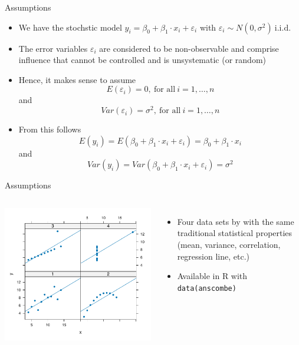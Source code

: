 \documentclass[aspectratio=169]{beamer}
\begin{document}
\begin{frame}{Assumptions}
  \begin{itemize}
    \item We have the stochstic model $y_i = \beta_0 + \beta_1 \cdot x_i +
      \varepsilon_i$ with $\varepsilon_i \sim N(0, \sigma^2)~\text{i.i.d.}$
    \item The error variables $\varepsilon_i$ are considered to be
      non-observable and comprise influence that cannot be controlled and is
      unsystematic (or random)
    \item Hence, it makes sense to assume
    \[
      E(\varepsilon_i) = 0, ~\text{for all}~ i = 1, \ldots, n
    \]
    and
    \[
      Var(\varepsilon_i) = \sigma^2, ~\text{for all}~ i = 1, \ldots, n
    \]
  \item From this follows
\[
  E(y_i) = E(\beta_0 + \beta_1 \cdot x_i + \varepsilon_i) =
  \beta_0 + \beta_1 \cdot x_i
\]
and
\[
  Var(y_i) = Var(\beta_0 + \beta_1 \cdot x_i + \varepsilon_i) = \sigma^2
\]
  \end{itemize}
\end{frame}

\begin{frame}{Assumptions}
  \begin{columns}
    \includegraphics[scale=.6]{../figures/anscombe} 
  \begin{itemize}
    \item Four data sets by \citet{Anscombe1973} with the same traditional
      statistical properties (mean, variance, correlation, regression line,
      etc.)
    \item Available in R with \texttt{data(anscombe)}
  \end{itemize}
  \end{columns}
\end{frame}
\end{document}
